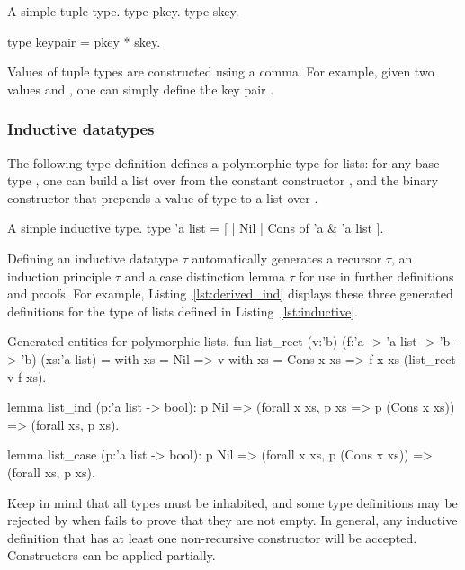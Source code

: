 \begin{easycrypt}[label={lst:tuples}]{A simple tuple type.}
type pkey.
type skey.

type keypair = pkey * skey.
\end{easycrypt}

Values of tuple types are constructed using a comma. For example, given two
values  and , one can simply define the key pair
.

\subsubsection*{Inductive datatypes}
The following type definition defines a polymorphic type for lists: for any
base type , one can build a list over  from the constant
constructor , and the binary constructor  that prepends a
value of type  to a list over .

\begin{easycrypt}[label={lst:inductive}]{A simple inductive type.}
type 'a list = [
  | Nil
  | Cons of 'a & 'a list ].
\end{easycrypt}

Defining an inductive datatype $\tau$ automatically generates a recursor
$\tau$, an induction principle $\tau$ and a case distinction
lemma $\tau$ for use in further definitions and proofs. For example,
Listing~\ref{lst:derived_ind} displays these three generated definitions for the
type of lists defined in Listing~\ref{lst:inductive}.

\begin{easycrypt}[label={lst:derived_ind}]{Generated entities for polymorphic lists.}
fun list_rect (v:'b) (f:'a -> 'a list -> 'b -> 'b) (xs:'a list) =
  with xs = Nil        => v
  with xs = Cons x xs => f x xs (list_rect v f xs).

lemma list_ind (p:'a list -> bool):
  p Nil =>
  (forall x xs, p xs => p (Cons x xs)) =>
  (forall xs, p xs).

lemma list_case (p:'a list -> bool):
  p Nil =>
  (forall x xs, p (Cons x xs)) =>
  (forall xs, p xs).
\end{easycrypt}

Keep in mind that all types must be inhabited, and some type definitions may be
rejected by \EasyCrypt when \WhyThree fails to prove that they are not empty. In
general, any inductive definition that has at least one non-recursive
constructor will be accepted. Constructors can be applied partially.

